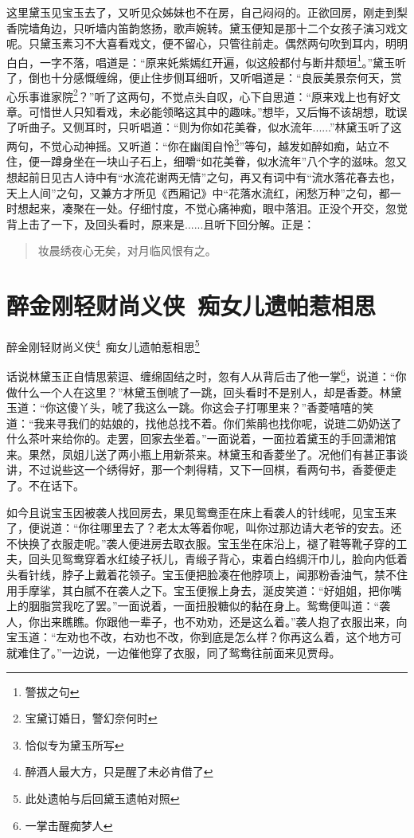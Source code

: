 \documentclass[12pt,oneside]{book}
\newenvironment{shici}{%
\begin{verse}%
\centering\large\hspace{12pt}}%
{\end{verse}}
\begin{document}
这里黛玉见宝玉去了，又听见众姊妹也不在房，自己闷闷的。正欲回房，刚走到梨香院墙角边，只听墙内笛韵悠扬，歌声婉转。黛玉便知是那十二个女孩子演习戏文呢。只黛玉素习不大喜看戏文，便不留心，只管往前走。偶然两句吹到耳内，明明白白，一字不落，唱道是：“原来奼紫嫣红开遍，似这般都付与断井颓垣\footnote{警拔之句}。”黛玉听了，倒也十分感慨缠绵，便止住步侧耳细听，又听唱道是：“良辰美景奈何天，赏心乐事谁家院\footnote{宝黛订婚日，警幻奈何时}？”听了这两句，不觉点头自叹，心下自思道：“原来戏上也有好文章。可惜世人只知看戏，未必能领略这其中的趣味。”想毕，又后悔不该胡想，耽误了听曲子。又侧耳时，只听唱道：“则为你如花美眷，似水流年......”林黛玉听了这两句，不觉心动神摇。又听道：“你在幽闺自怜\footnote{恰似专为黛玉所写}”等句，越发如醉如痴，站立不住，便一蹲身坐在一块山子石上，细嚼“如花美眷，似水流年”八个字的滋味。忽又想起前日见古人诗中有“水流花谢两无情”之句，再又有词中有“流水落花春去也，天上人间”之句，又兼方才所见《西厢记》中“花落水流红，闲愁万种”之句，都一时想起来，凑聚在一处。仔细忖度，不觉心痛神痴，眼中落泪。正没个开交，忽觉背上击了一下，及回头看时，原来是......且听下回分解。正是：

\begin{shici}
妆晨绣夜心无矣，对月临风恨有之。
\end{shici}

\chapter{醉金刚轻财尚义侠~痴女儿遗帕惹相思}
醉金刚轻财尚义侠\footnote{醉酒人最大方，只是醒了未必肯借了}~痴女儿遗帕惹相思\footnote{此处遗帕与后回黛玉遗帕对照}

话说林黛玉正自情思萦逗、缠绵固结之时，忽有人从背后击了他一掌\footnote{一掌击醒痴梦人}，说道：“你做什么一个人在这里？”林黛玉倒唬了一跳，回头看时不是别人，却是香菱。林黛玉道：“你这傻丫头，唬了我这么一跳。你这会子打哪里来？”香菱嘻嘻的笑道：“我来寻我们的姑娘的，找他总找不着。你们紫鹃也找你呢，说琏二奶奶送了什么茶叶来给你的。走罢，回家去坐着。”一面说着，一面拉着黛玉的手回潇湘馆来。果然，凤姐儿送了两小瓶上用新茶来。林黛玉和香菱坐了。况他们有甚正事谈讲，不过说些这一个绣得好，那一个刺得精，又下一回棋，看两句书，香菱便走了。不在话下。

如今且说宝玉因被袭人找回房去，果见鸳鸯歪在床上看袭人的针线呢，见宝玉来了，便说道：“你往哪里去了？老太太等着你呢，叫你过那边请大老爷的安去。还不快换了衣服走呢。”袭人便进房去取衣服。宝玉坐在床沿上，褪了鞋等靴子穿的工夫，回头见鸳鸯穿着水红绫子袄儿，青缎子背心，束着白绉绸汗巾儿，脸向内低着头看针线，脖子上戴着花领子。宝玉便把脸凑在他脖项上，闻那粉香油气，禁不住用手摩挲，其白腻不在袭人之下。宝玉便猴上身去，涎皮笑道：“好姐姐，把你嘴上的胭脂赏我吃了罢。”一面说着，一面扭股糖似的黏在身上。鸳鸯便叫道：“袭人，你出来瞧瞧。你跟他一辈子，也不劝劝，还是这么着。”袭人抱了衣服出来，向宝玉道：“左劝也不改，右劝也不改，你到底是怎么样？你再这么着，这个地方可就难住了。”一边说，一边催他穿了衣服，同了鸳鸯往前面来见贾母。
\end{document}
